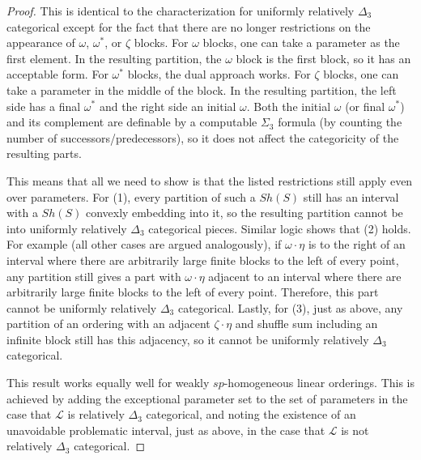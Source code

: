 \documentclass[11pt]{amsart}
\theoremstyle{definition}
\def\L{\mathcal L}
\begin{document}
    \begin{proof}
        This is identical to the characterization for uniformly relatively $\Delta_3$ categorical except for the fact that there are no longer restrictions on the appearance of $\omega$, $\omega^*$, or $\zeta$ blocks.
        For $\omega$ blocks, one can take a parameter as the first element.
        In the resulting partition, the $\omega$ block is the first block, so it has an acceptable form.
        For $\omega^*$ blocks, the dual approach works.
        For $\zeta$ blocks, one can take a parameter in the middle of the block.
        In the resulting partition, the left side has a final $\omega^*$ and the right side an initial $\omega$.
        Both the initial $\omega$ (or final $\omega^*$) and its complement are definable by a computable $\Sigma_3$ formula (by counting the number of successors/predecessors), so it does not affect the categoricity of the resulting parts.

        This means that all we need to show is that the listed restrictions still apply even over parameters.
        For (1), every partition of such a $Sh(S)$ still has an interval with a $Sh(S)$ convexly embedding into it, so the resulting partition cannot be into uniformly relatively $\Delta_3$ categorical pieces.
        Similar logic shows that (2) holds.
        For example (all other cases are argued analogously), if $\omega\cdot\eta$ is to the right of an interval where there are arbitrarily large finite blocks to the left of every point, any partition still gives a part with $\omega\cdot\eta$ adjacent to an interval where there are arbitrarily large finite blocks to the left of every point.
        Therefore, this part cannot be uniformly relatively $\Delta_3$ categorical.
        Lastly, for (3), just as above, any partition of an ordering with an adjacent $\zeta\cdot\eta$ and shuffle sum including an infinite block still has this adjacency, so it cannot be uniformly relatively $\Delta_3$ categorical.

        This result works equally well for weakly $sp$-homogeneous linear orderings.
        This is achieved by adding the exceptional parameter set to the set of parameters in the case that $\L$ is relatively $\Delta_3$ categorical, and noting the existence of an unavoidable problematic interval, just as above, in the case that $\L$ is not relatively $\Delta_3$ categorical.
    \end{proof}
\end{document}
